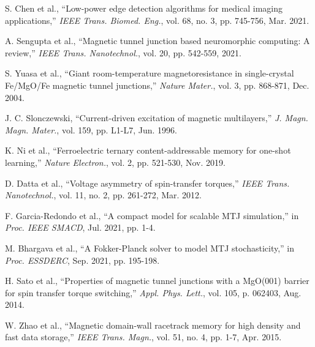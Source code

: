 \documentclass[conference]{IEEEtran}
\begin{document}
\begin{thebibliography}{00}
 S. Chen et al., ``Low-power edge detection algorithms for medical imaging applications,'' \textit{IEEE Trans. Biomed. Eng.}, vol. 68, no. 3, pp. 745-756, Mar. 2021.

 A. Sengupta et al., ``Magnetic tunnel junction based neuromorphic computing: A review,'' \textit{IEEE Trans. Nanotechnol.}, vol. 20, pp. 542-559, 2021.

 S. Yuasa et al., ``Giant room-temperature magnetoresistance in single-crystal Fe/MgO/Fe magnetic tunnel junctions,'' \textit{Nature Mater.}, vol. 3, pp. 868-871, Dec. 2004.

 J. C. Slonczewski, ``Current-driven excitation of magnetic multilayers,'' \textit{J. Magn. Magn. Mater.}, vol. 159, pp. L1-L7, Jun. 1996.

 K. Ni et al., ``Ferroelectric ternary content-addressable memory for one-shot learning,'' \textit{Nature Electron.}, vol. 2, pp. 521-530, Nov. 2019.

 D. Datta et al., ``Voltage asymmetry of spin-transfer torques,'' \textit{IEEE Trans. Nanotechnol.}, vol. 11, no. 2, pp. 261-272, Mar. 2012.

 F. Garcia-Redondo et al., ``A compact model for scalable MTJ simulation,'' in \textit{Proc. IEEE SMACD}, Jul. 2021, pp. 1-4.

 M. Bhargava et al., ``A Fokker-Planck solver to model MTJ stochasticity,'' in \textit{Proc. ESSDERC}, Sep. 2021, pp. 195-198.

 H. Sato et al., ``Properties of magnetic tunnel junctions with a MgO(001) barrier for spin transfer torque switching,'' \textit{Appl. Phys. Lett.}, vol. 105, p. 062403, Aug. 2014.

 W. Zhao et al., ``Magnetic domain-wall racetrack memory for high density and fast data storage,'' \textit{IEEE Trans. Magn.}, vol. 51, no. 4, pp. 1-7, Apr. 2015.

\end{thebibliography}
\end{document}
